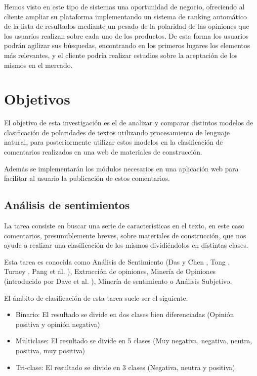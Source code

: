 Hemos visto en este tipo de sistemas una oportunidad de negocio, ofreciendo al cliente ampliar su plataforma implementando un sistema de ranking automático de la lista de resultados mediante un pesado de la polaridad de las opiniones que los usuarios realizan sobre cada uno de los productos. De esta forma los usuarios podrán agilizar sus búsquedas, encontrando en los primeros lugares los elementos más relevantes, y el cliente podría realizar estudios sobre la aceptación de los mismos en el mercado.

\section{Objetivos}

El objetivo de esta investigación es el de analizar y comparar distintos modelos de clasificación de polaridades de textos utilizando procesamiento de lenguaje natural, para posteriormente utilizar estos modelos en la clasificación de comentarios realizados en una web de materiales de construcción.

Además se implementarán los módulos necesarios en una aplicación web para facilitar al usuario la publicación de estos comentarios.

\subsection{Análisis de sentimientos}

La tarea consiste en buscar una serie de características en el texto, en este caso comentarios, presumiblemente breves, sobre materiales de construcción, que nos ayude a realizar una clasificación de los mismos dividiéndolos en distintas clases.

Esta tarea es conocida como Análisis de Sentimiento (Das y Chen \cite{Das}, Tong \cite{Tong}, Turney \cite{Turney}, Pang et al. \cite{Pang}), Extracción de opiniones, Minería de Opiniones (introducido por Dave et al. \cite{Dave}), Minería de sentimiento o Análisis Subjetivo.

El ámbito de clasificación de esta tarea suele ser el siguiente:
\begin{itemize}
	\item Binario: El resultado se divide en dos clases bien diferenciadas (Opinión positiva y opinión negativa)
	\item Multiclase: El resultado se divide en 5 clases (Muy negativa, negativa, neutra, positiva, muy positiva)
	\item Tri-clase: El resultado se divide en 3 clases (Negativa, neutra y positiva)
\end{itemize}

